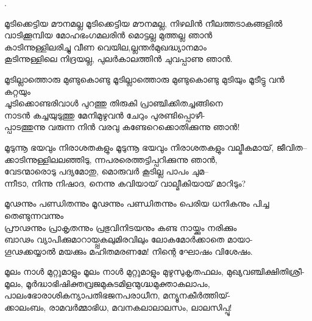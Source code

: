 \begin{enumerate}

.


\begin{slokam}{\VSv}{\VRV}{മൂടിക്കെട്ടിയ മൗനമല്ല}
മൂടിക്കെട്ടിയ മൗനമല്ല, നിഴലിൻ നീലത്തടാകങ്ങളിൽ\\
വാടിക്കൂമ്പിയ മോഹഭംഗമലരിൻ മൊട്ടല്ല മുത്തല്ല ഞാൻ\\
കാടിന്നുള്ളിലരിച്ചു വീണ വെയില,ല്ലന്തർമുഖദ്ധ്യാനമാം\\
കൂടിന്നുള്ളിലെ നിദ്രയല്ല, പുലർകാലത്തിൻ ചുവപ്പാണു ഞാൻ.
\end{slokam}



\begin{slokam}{\VSv}{\Poonth}{മൂടില്ലാത്തൊരു മുണ്ടുകൊണ്ടു}
മൂടില്ലാത്തൊരു മുണ്ടുകൊണ്ടു മുടിയും മൂടീട്ടു വൻ കറ്റയും\\
ചൂടിക്കൊണ്ടരിവാള്‍ പുറത്തു തിരുകി പ്രാഞ്ചിക്കിതച്ചങ്ങിനെ\\
നാടൻ കച്ചയുടുത്തു മേനിമുഴുവൻ ചേറും പുരണ്ടിപ്പൊഴീ-\\
പ്പാടത്തുന്നു വരുന്ന നിൻ വരവു കണ്ടേറെക്കൊതിക്കുന്നു ഞാൻ!
\end{slokam}




\begin{slokam}{\VSv}{\UN}{മൂടുന്നൂ ഭയവും നിരാശതകളും}
മൂടുന്നൂ ഭയവും നിരാശതകളും വല്മീകമായ്, ജീവിത--\\
ക്കാടിന്നുള്ളിലലഞ്ഞിടു, ന്നപരരെത്തട്ടിപ്പറിക്കുന്നു ഞാൻ,\\
വേടന്മാരൊടു പദ്യമോതു, മൊരുവർ കൂടില്ല പാപം ചുമ--\\
ന്നീടാ, നിന്നു നിഷാദ, നെന്നു കവിയായ് വാല്മീകിയായ് മാറിടും?
\end{slokam}


\begin{slokam}{\VSr}{\KKT}{മൂഢന്നും പണ്ഡിതന്നും}
 മൂഢന്നും പണ്ഡിതന്നും പെരിയ ധനികനും പിച്ച തെണ്ടുന്നവന്നും\\
പ്രൗഢന്നും പ്രാകൃതന്നും പ്രഭുവിനിടയനും കണ്ട നായ്ക്കും നരിക്കും\\
ബാഢം വ്യാപിക്കുമാറായ്പ്പകലുമിരവിലും ലോകമോർക്കാതെ മായാ-\\
ഗൂഢക്കയ്യാൽ മയക്കും മഹിതമരണമേ! നിന്റെ ഘോഷം വിശേഷം.
\end{slokam}


\begin{slokam}{\VSr}{\Ull}{മൂലം നാള്‍ മുറ്റുമാളും}
 മൂലം നാള്‍ മുറ്റുമാളും മുഴുസുകൃതഫലം, മുഖ്യവഞ്ചിക്ഷിതിശ്രീ-\\
മൂലം, മൂർദ്ധാഭിഷിക്തവ്രജമുകുടമിളന്മുഗ്ദ്ധമുക്താകലാപം,\\
പാലംഭോരാശികന്യാപതിഭജനപരാധീന, മന്യൂനകീർത്തിയ്‌-\\
ക്കാലംബം, രാമവർമ്മാഭിധ, മവനകലാലാലസം, ലാലസിപ്പൂ!
\end{slokam}


\end{enumerate}
